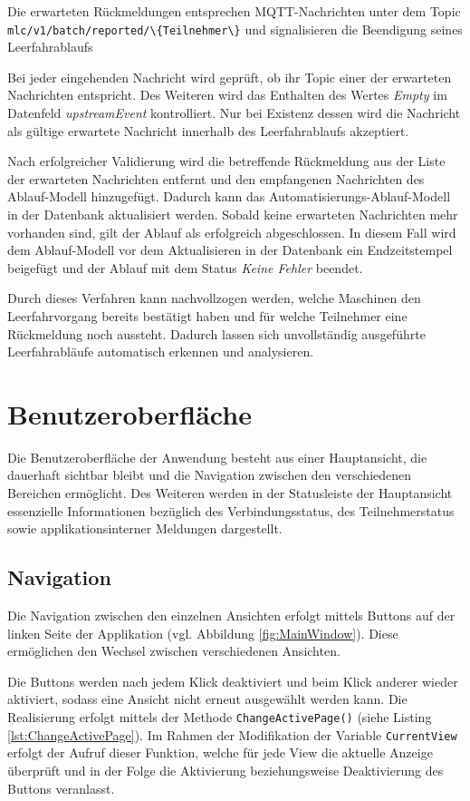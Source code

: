 Die erwarteten Rückmeldungen entsprechen MQTT-Nachrichten unter dem Topic \lstinline|mlc/v1/batch/reported/\{Teilnehmer\}| und signalisieren die Beendigung seines Leerfahrablaufs

Bei jeder eingehenden Nachricht wird geprüft, ob ihr Topic einer der erwarteten Nachrichten entspricht. Des Weiteren wird das Enthalten des Wertes \textit{Empty} im Datenfeld \textit{upstreamEvent} kontrolliert. Nur bei Existenz dessen wird die Nachricht als gültige erwartete Nachricht innerhalb des Leerfahrablaufs akzeptiert.

Nach erfolgreicher Validierung wird die betreffende Rückmeldung aus der Liste der erwarteten Nachrichten entfernt und den empfangenen Nachrichten des Ablauf-Modell hinzugefügt. Dadurch kann das Automatisierungs-Ablauf-Modell in der Datenbank aktualisiert werden. Sobald keine erwarteten Nachrichten mehr vorhanden sind, gilt der Ablauf als erfolgreich abgeschlossen. In diesem Fall wird dem Ablauf-Modell vor dem Aktualisieren in der Datenbank ein Endzeitstempel beigefügt und der Ablauf mit dem Status \textit{Keine Fehler} beendet. 

Durch dieses Verfahren kann nachvollzogen werden, welche Maschinen den Leerfahrvorgang bereits bestätigt haben und für welche Teilnehmer eine Rückmeldung noch aussteht. Dadurch lassen sich unvollständig ausgeführte Leerfahrabläufe automatisch erkennen und analysieren.
\section{Benutzeroberfläche}
Die Benutzeroberfläche der Anwendung besteht aus einer Hauptansicht, die dauerhaft sichtbar bleibt und die Navigation zwischen den verschiedenen Bereichen ermöglicht. Des Weiteren werden in der Statusleiste der Hauptansicht essenzielle Informationen bezüglich des Verbindungsstatus, des Teilnehmerstatus sowie applikationsinterner Meldungen dargestellt.

\subsection{Navigation}
Die Navigation zwischen den einzelnen Ansichten erfolgt mittels Buttons auf der linken Seite der Applikation (vgl. Abbildung \ref{fig:MainWindow}). Diese ermöglichen den Wechsel zwischen verschiedenen Ansichten. 

Die Buttons werden nach jedem Klick deaktiviert und beim Klick anderer wieder aktiviert, sodass eine Ansicht nicht erneut ausgewählt werden kann. Die Realisierung erfolgt mittels der Methode \lstinline|ChangeActivePage()| (siehe Listing \ref{lst:ChangeActivePage}). Im Rahmen der Modifikation der Variable \lstinline|CurrentView| erfolgt der Aufruf dieser Funktion, welche für jede View die aktuelle Anzeige überprüft und in der Folge die Aktivierung beziehungsweise Deaktivierung des Buttons veranlasst.

